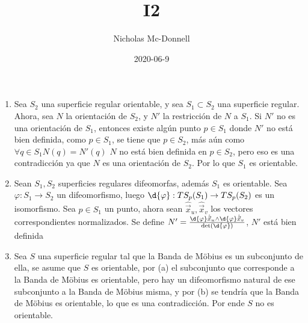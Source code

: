 \documentclass{homework}
\title{I2}
\date{2020-06-9}
\author{Nicholas Mc-Donnell}
\begin{document}
\maketitle
\newpage
{}

\begin{sol}
    \begin{enumerate}
        \item Sea \(S_2\) una superficie regular orientable, y sea \(S_1\subset S_2\) una superficie regular. Ahora, sea \(N\) la orientación de \(S_2\), y \(N'\) la restricción de \(N\) a \(S_1\). Si \(N'\) no es una orientación de \(S_1\), entonces existe algún punto \(p\in S_1\) donde \(N'\) no está bien definida, como \(p\in S_1\), se tiene que \(p\in S_2\), más aún como \(\forall q\in S_1 N(q)=N'(q)\) \(N\) no está bien definida en \(p\in S_2\), pero eso es una contradicción ya que \(N\) es una orientación de \(S_2\). Por lo que \(S_1\) es orientable.
        \item Sean \(S_1, S_2\) superficies regulares difeomorfas, además \(S_1\) es orientable. Sea \(\varphi:S_1\rightarrow S_2\) un difeomorfismo, luego \(\d{\varphi}:TS_p(S_1)\rightarrow TS_p(S_2)\) es un isomorfismo. Sea \(p\in S_1\) un punto, ahora sean \(\hat{\vec{x}}_u,\hat{\vec{x}}_v\) los vectores correspondientes normalizados. Se define \(N'=\frac{\d{\varphi}\hat{\vec{x}}_u\wedge\d{\varphi}\hat{\vec{x}}_v}{\det(\d{\varphi})}\), \(N'\) está bien definida
        \item Sea \(S\) una superficie regular tal que la Banda de Möbius es un subconjunto de ella, se asume que \(S\) es orientable, por (a) el subconjunto que corresponde a la Banda de Möbius es orientable, pero hay un difeomorfismo natural de ese subconjunto a la Banda de Möbius misma, y por (b) se tendría que la Banda de Möbius es orientable, lo que es una contradicción. Por ende \(S\) no es orientable.
    \end{enumerate}
\end{sol}
\end{document}
